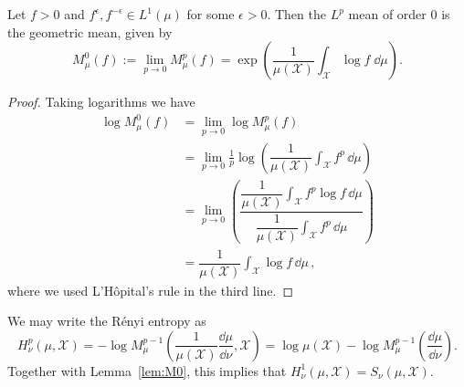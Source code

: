 \documentclass[reqno]{amsart}
\begin{document}
\begin{lem}
\label{lem:M0}
Let $f>0$ and $f^{\epsilon}, f^{-\epsilon} \in L^1(\mu)$ for some $\epsilon>0$. Then the $L^p$ mean of order $0$ is the geometric mean, given by 
\begin{equation}
M^0_\mu (f) :=\lim_{p \rightarrow 0} M^p_\mu (f) 
= \exp\left( \dfrac{1}{\mu(\mathcal{X})}\int_\mathcal{X}  \log f \; \dd \mu \right).
\end{equation}
\end{lem}
\begin{proof}
Taking logarithms we have
\begin{align*}
\log M^0_\mu (f) &=\lim_{p \rightarrow 0} \log M^p_\mu (f) \\
&= \lim_{p \rightarrow 0} \frac{1}{p} \log \left(   \dfrac{1}{\mu(\mathcal{X})}  \int_\mathcal{X}  f^p \, \dd \mu \right) \\
&= \lim_{p \rightarrow 0} \left( \dfrac{ \dfrac{1}{\mu(\mathcal{X})}  \int_\mathcal{X}  f^p \log f \, \dd \mu}{  \dfrac{1}{\mu(\mathcal{X})}  \int_\mathcal{X}  f^p \, \dd \mu }  \right)  \\
&=\dfrac{1}{\mu(\mathcal{X})}  \int_\mathcal{X}   \log f \, \dd \mu  \, ,
\end{align*}
where we used L'Hôpital's rule in the third line.
\end{proof}

\begin{remark}
\label{rem:ren-ent-M}
We may write the R\'enyi entropy as 
$$
H^p_\nu(\mu,\mathcal{X}) =  - \log M_\mu^{p-1} \left(\dfrac{1}{\mu(\mathcal{X}) } \dfrac{\dd \mu}{\dd \nu}, \mathcal{X} \right) 
=  \log \mu(\mathcal{X}) - \log M_\mu^{p-1} \left( \dfrac{\dd \mu}{\dd \nu} \right) .
 $$
 Together with Lemma~\ref{lem:M0}, this implies that 
$H^1_\nu(\mu, \mathcal{X}) = S_\nu(\mu, \mathcal{X})$.
\end{remark}
\end{document}
